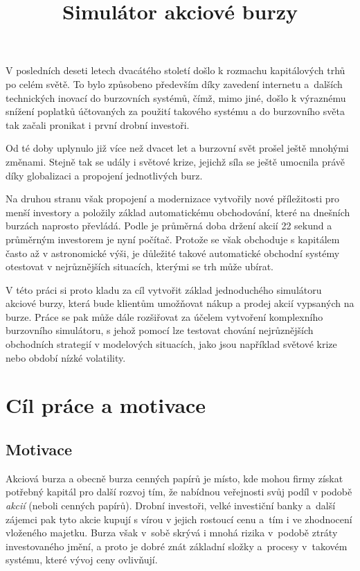\documentclass[thesis=M,czech]{FITthesis}[2012/06/26]
\title{Simulátor akciové burzy}
\begin{document}

\begin{introduction}

	V posledních deseti letech dvacátého století došlo k rozmachu kapitálových trhů po celém světě. To bylo způsobeno především díky zavedení internetu a~dalších technických inovací do burzovních systémů, čímž, mimo jiné, došlo k výraznému snížení poplatků účtovaných za použití takového systému a do burzovního světa tak začali pronikat i první drobní investoři.
	
	Od té doby uplynulo již více než dvacet let a burzovní svět prošel ještě mnohými změnami. Stejně tak se udály i světové krize, jejichž síla se ještě umocnila právě díky globalizaci a propojení jednotlivých burz.
	
	Na druhou stranu však propojení a modernizace vytvořily nové příležitosti pro menší investory a položily základ automatickému obchodování, které na dnešních burzách naprosto převládá. Podle \cite{Sharehold} je průměrná doba držení akcií 22 sekund a průměrným investorem je nyní počítač. Protože se však obchoduje s kapitálem často až v astronomické výši, je důležité takové automatické obchodní systémy otestovat v nejrůznějších situacích, kterými se trh může ubírat.

	V této práci si proto kladu za cíl vytvořit základ jednoduchého simulátoru akciové burzy, která bude klientům umožňovat nákup a prodej akcií vypsaných na burze. Práce se pak může dále rozšiřovat za účelem vytvoření komplexního burzovního simulátoru, s jehož pomocí lze testovat chování nejrůznějších obchodních strategií v modelových situacích, jako jsou například světové krize nebo období nízké volatility.
	
	
\end{introduction}
\chapter{Cíl práce a motivace}
\label{chap:motivation}

\section{Motivace}
	Akciová burza a obecně burza cenných papírů je místo, kde mohou firmy získat potřebný kapitál pro další rozvoj tím, že nabídnou veřejnosti svůj podíl v podobě \textit{akcií} (neboli cenných papírů). Drobní investoři, velké investiční banky a~další zájemci pak tyto akcie kupují s vírou v jejich rostoucí cenu a~tím i ve zhodnocení vloženého majetku. Burza však v~sobě skrývá i mnohá rizika v~podobě ztráty investovaného jmění, a proto je dobré znát základní složky a~procesy v~takovém systému, které vývoj ceny ovlivňují.
\end{document}
